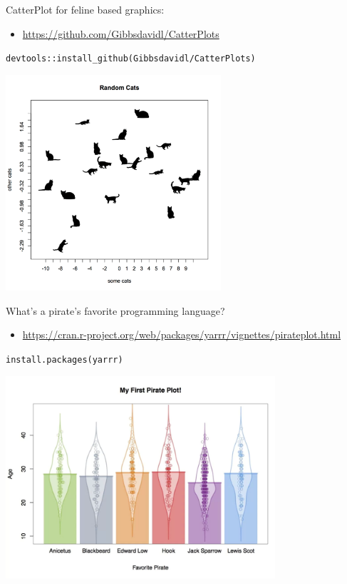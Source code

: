 \documentclass[
  ignorenonframetext,
]{beamer}
\providecommand{\tightlist}{%
  \setlength{\itemsep}{0pt}\setlength{\parskip}{0pt}}
\begin{document}
\begin{frame}[fragile]{CatterPlot for feline based graphics:}
\protect\hypertarget{catterplot-for-feline-based-graphics}{}

\begin{itemize}
\tightlist
\item
  \url{https://github.com/Gibbsdavidl/CatterPlots}
\end{itemize}

\texttt{devtools::install\_github(Gibbsdavidl/CatterPlots)}

\includegraphics[width=0.6\textwidth,height=\textheight]{../external/images/funR_1_catterplotter.png}

\end{frame}

\begin{frame}[fragile]{What's a pirate's favorite programming language?}
\protect\hypertarget{whats-a-pirates-favorite-programming-language}{}

\begin{itemize}
\tightlist
\item
  \url{https://cran.r-project.org/web/packages/yarrr/vignettes/pirateplot.html}
\end{itemize}

\texttt{install.packages(\textquotesingle{}yarrr\textquotesingle{})}

\includegraphics[width=0.75\textwidth,height=\textheight]{../external/images/funR_2_pirate.png}

\end{frame}
\end{document}
